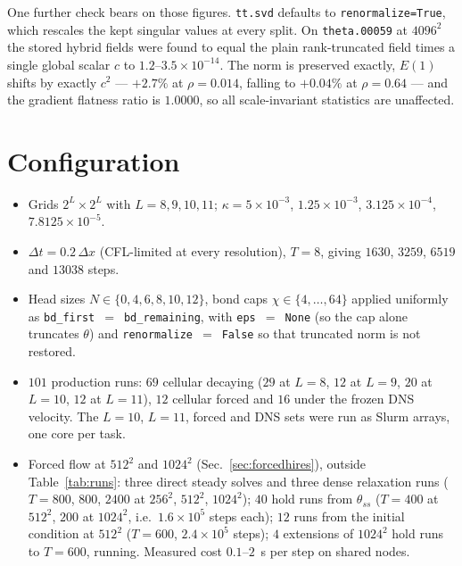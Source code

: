 \documentclass[aps,prfluids,reprint,onecolumn,amsmath,amssymb,nofootinbib,floatfix]{revtex4-2}
\newcommand{\code}[1]{\texttt{\small #1}}
\begin{document}
One further check bears on those figures. \code{tt.svd} defaults to
\code{renormalize=True}, which rescales the kept singular values at every split.
On \code{theta.00059} at $4096^2$ the stored hybrid fields were found to equal
the plain rank-truncated field times a single global scalar $c$ to
$1.2$--$3.5\times10^{-14}$. The norm is preserved exactly, $E(1)$ shifts by
exactly $c^2$ --- $+2.7\%$ at $\rho=0.014$, falling to $+0.04\%$ at $\rho=0.64$
--- and the gradient flatness ratio is $1.0000$, so all scale-invariant
statistics are unaffected.

\section{Configuration}

\begin{itemize}
\item Grids $2^L\times2^L$ with $L=8,9,10,11$; $\kappa=5\times10^{-3}$,
  $1.25\times10^{-3}$, $3.125\times10^{-4}$, $7.8125\times10^{-5}$.
\item $\Delta t=0.2\,\Delta x$ (CFL-limited at every resolution), $T=8$, giving
  $1630$, $3259$, $6519$ and $13038$ steps.
\item Head sizes $N\in\{0,4,6,8,10,12\}$, bond caps $\chi\in\{4,\dots,64\}$
  applied uniformly as \code{bd\_first}~$=$~\code{bd\_remaining}, with
  \code{eps}~$=$~\code{None} (so the cap alone truncates $\theta$) and
  \code{renormalize}~$=$~\code{False} so that truncated norm is not restored.
\item $101$ production runs: $69$ cellular decaying ($29$ at $L=8$, $12$ at
  $L=9$, $20$ at $L=10$, $12$ at $L=11$), $12$ cellular forced and $16$ under
  the frozen DNS velocity. The $L=10$, $L=11$, forced and DNS sets were run as
  Slurm arrays, one core per task.
\item Forced flow at $512^2$ and $1024^2$ (Sec.~\ref{sec:forcedhires}),
  outside Table~\ref{tab:runs}: three direct steady solves and three dense
  relaxation runs ($T=800$, $800$, $2400$ at $256^2$, $512^2$, $1024^2$); $40$
  hold runs from $\theta_{ss}$ ($T=400$ at $512^2$, $200$ at $1024^2$, i.e.\
  $1.6\times10^5$ steps each); $12$ runs from the initial condition at $512^2$
  ($T=600$, $2.4\times10^5$ steps); $4$ extensions of $1024^2$ hold runs to
  $T=600$, running. Measured cost $0.1$--$2$~s per step on shared nodes.
\end{itemize}
\end{document}
